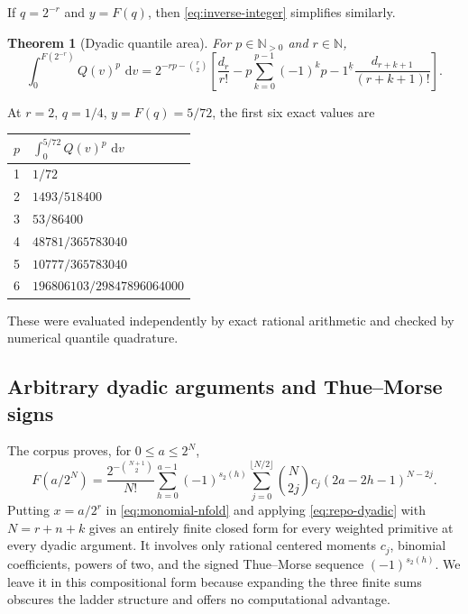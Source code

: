 \documentclass[11pt,oneside]{article}
\numberwithin{equation}{section}
\newtheorem{theorem}{Theorem}[section]
\theoremstyle{definition}
\theoremstyle{remark}
\newcommand{\N}{\mathbb N}
\newcommand{\wt}{s_2}
\newcommand{\dd}{\,\mathrm d}
\newcommand{\fall}[2]{#1^{\underline{#2}}}
\begin{document}
If $q=2^{-r}$ and $y=F(q)$, then \eqref{eq:inverse-integer} simplifies similarly.

\begin{theorem}[Dyadic quantile area]
\label{thm:dyadic-inverse-area}
For $p\in\N_{>0}$ and $r\in\N$,
\begin{equation}
 \boxed{
 \int_0^{F(2^{-r})}Q(v)^p\,\dd v
 =2^{-rp-\binom r2}
 \left[
 \frac{d_r}{r!}
 -p\sum_{k=0}^{p-1}(-1)^k\fall{p-1}k
 \frac{d_{r+k+1}}{(r+k+1)!}
 \right].}
 \label{eq:dyadic-inverse-area}
\end{equation}
\end{theorem}

At $r=2$, $q=1/4$, $y=F(q)=5/72$, the first six exact values are
\begin{center}
\begin{tabular}{@{}cl@{}}
\toprule
$p$ & $\displaystyle\int_0^{5/72}Q(v)^p\,\dd v$\\
\midrule
1 & $1/72$\\
2 & $1493/518400$\\
3 & $53/86400$\\
4 & $48781/365783040$\\
5 & $10777/365783040$\\
6 & $196806103/29847896064000$\\
\bottomrule
\end{tabular}
\end{center}
These were evaluated independently by exact rational arithmetic and checked by numerical
quantile quadrature.

\subsection{Arbitrary dyadic arguments and Thue--Morse signs}

The corpus proves, for $0\le a\le2^N$,
\begin{equation}
 F(a/2^N)=\frac{2^{-\binom{N+1}{2}}}{N!}
 \sum_{h=0}^{a-1}(-1)^{\wt(h)}
 \sum_{j=0}^{\lfloor N/2\rfloor}\binom N{2j}c_j
 (2a-2h-1)^{N-2j}.                                          \label{eq:repo-dyadic}
\end{equation}
Putting $x=a/2^r$ in \eqref{eq:monomial-nfold} and applying
\eqref{eq:repo-dyadic} with $N=r+n+k$ gives an entirely finite closed form for every
weighted primitive at every dyadic argument.  It involves only rational centered moments
$c_j$, binomial coefficients, powers of two, and the signed Thue--Morse sequence
$(-1)^{\wt(h)}$.  We leave it in this compositional form because expanding the three finite
sums obscures the ladder structure and offers no computational advantage.
\end{document}

